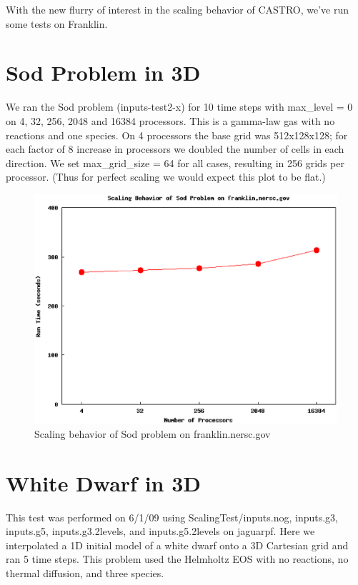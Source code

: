 With the new flurry of interest in the scaling behavior of CASTRO, we've run some tests on Franklin.
\section{Sod Problem in 3D}
We ran the Sod problem (inputs-test2-x) for 10 time steps with max\_level = 0 on 4, 32, 256, 2048 and 16384 processors. This is a gamma-law gas with no reactions and one species. On 4 processors the base grid was 512x128x128; for each factor of 8 increase in processors we doubled the number of cells in each direction. We set max\_grid\_size = 64 for all cases, resulting in 256 grids per processor. (Thus for perfect scaling we would expect this plot to be flat.) 
\begin{figure}[h]
\centering
\includegraphics[width=5in]{Sod_scaling}
\caption{Scaling behavior of Sod problem on franklin.nersc.gov}
\end{figure}
\section{White Dwarf in 3D}\label{Sec:White Dwarf in 3D}
This test was performed on 6/1/09 using ScalingTest/inputs.nog, inputs.g3, inputs.g5, inputs.g3.2levels, and inputs.g5.2levels on jaguarpf.  Here we interpolated a 1D initial model of a white dwarf onto a 3D Cartesian grid and ran 5 time steps. This problem used the Helmholtz EOS with no reactions, no thermal diffusion, and three species.  

